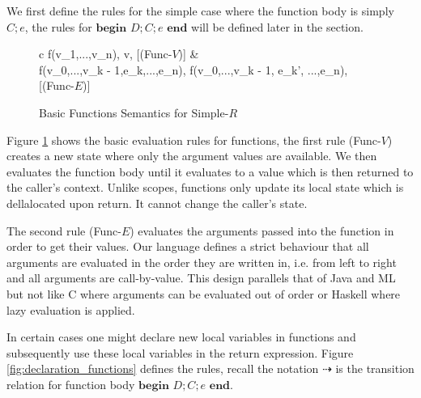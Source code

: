 \documentclass[a4paper,12pt]{report}
\begin{document}
\par
We first define the rules for the simple case where the function body is simply 
$C;e$, the rules for $\textbf{begin }D;C;e\textbf{ end}$ will be defined later 
in the section. 
\begin{figure}[H]
  \begin{center}
    \begin{tabular} {c}
      {\langle f(v_1,\text{ }...\text{ },v_n), \sigma \rangle \Longrightarrow \langle v, \sigma \rangle} [(Func-$V$)]
      & \\
      {\langle f(v_0,\text{ }...\text{ },v_{k - 1},e_k,\text{ }...\text{ },e_n), 
      \sigma \rangle \Longrightarrow \langle f(v_0,\text{ }...\text{ },v_{k - 1}, e_{k}',
      \text{ }...\text{ },e_n), \sigma \rangle} [(Func-$E$)]
    \end{tabular}
  \end{center}
  \caption{Basic Functions Semantics for Simple-$R$}
  \label{fig:basic_functions}
\end{figure}

\par
Figure \ref{fig:basic_functions} shows the basic evaluation rules for functions,  
the first rule (Func-$V$) creates a new state where only 
the argument values are available. We then evaluates the function body until it 
evaluates to a value which is then returned to the caller's context. Unlike 
scopes, functions only update its local state which is dellalocated upon return. 
It cannot change the caller's state. 

\par
The second rule (Func-$E$) evaluates the arguments passed into the 
function in order to get their values. Our language defines a strict 
behaviour that all arguments are evaluated in the order they are written in, 
i.e. from left to right and all arguments are call-by-value. This design parallels 
that of Java and ML but not like C where arguments can be evaluated out of order 
or Haskell where lazy evaluation is applied. 

\par
In certain cases one might declare new local variables in functions and 
subsequently use these local variables in the return expression. Figure 
\ref{fig:declaration_functions} defines the rules, recall the 
notation $\dashrightarrow$ is the transition relation for function body 
$\textbf{begin }D;C;e\textbf{ end}$.
\end{document}
